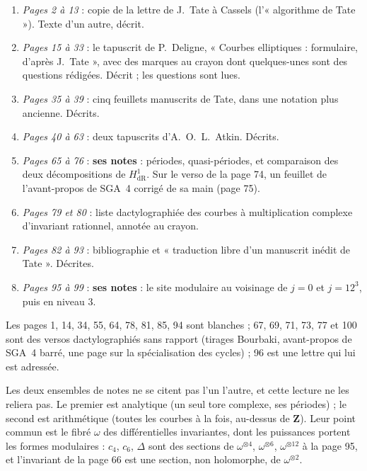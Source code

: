 \documentclass[11pt,a4paper]{article}
\begin{document}
\begin{enumerate}
\item \emph{Pages 2 à 13} : copie de la lettre de J.~Tate à Cassels
(l'« algorithme de Tate »). Texte d'un autre, décrit.
\item \emph{Pages 15 à 33} : le tapuscrit de P.~Deligne, « Courbes
elliptiques : formulaire, d'après J.~Tate », avec des marques au crayon dont
quelques-unes sont des questions rédigées. Décrit ; les questions sont lues.
\item \emph{Pages 35 à 39} : cinq feuillets manuscrits de Tate, dans une
notation plus ancienne. Décrits.
\item \emph{Pages 40 à 63} : deux tapuscrits d'A.~O.~L.~Atkin. Décrits.
\item \emph{Pages 65 à 76} : \textbf{ses notes} : périodes, quasi-périodes,
et comparaison des deux décompositions de $H^1_{\mathrm{dR}}$. Sur le verso de
la page 74, un feuillet de l'avant-propos de SGA~4 corrigé de sa main (page
75).
\item \emph{Pages 79 et 80} : liste dactylographiée des courbes à
multiplication complexe d'invariant rationnel, annotée au crayon.
\item \emph{Pages 82 à 93} : bibliographie et « traduction libre d'un
manuscrit inédit de Tate ». Décrites.
\item \emph{Pages 95 à 99} : \textbf{ses notes} : le site modulaire au
voisinage de $j=0$ et $j=12^3$, puis en niveau $3$.
\end{enumerate}

Les pages 1, 14, 34, 55, 64, 78, 81, 85, 94 sont blanches ; 67, 69, 71, 73, 77
et 100 sont des versos dactylographiés sans rapport (tirages Bourbaki, avant-propos
de SGA~4 barré, une page sur la spécialisation des cycles) ; 96 est une lettre
qui lui est adressée.

Les deux ensembles de notes ne se citent pas l'un l'autre, et cette lecture
ne les reliera pas. Le premier est analytique (un seul tore
complexe, ses périodes) ; le second est arithmétique (toutes les courbes à la
fois, au-dessus de $\mathbf{Z}$). Leur point commun est le fibré $\omega$ des
différentielles invariantes, dont les puissances portent les formes modulaires :
$c_4$, $c_6$, $\Delta$ sont des sections de $\omega^{\otimes 4}$,
$\omega^{\otimes 6}$, $\omega^{\otimes 12}$ à la page 95, et l'invariant de la
page 66 est une section, non holomorphe, de $\omega^{\otimes 2}$.
\end{document}
